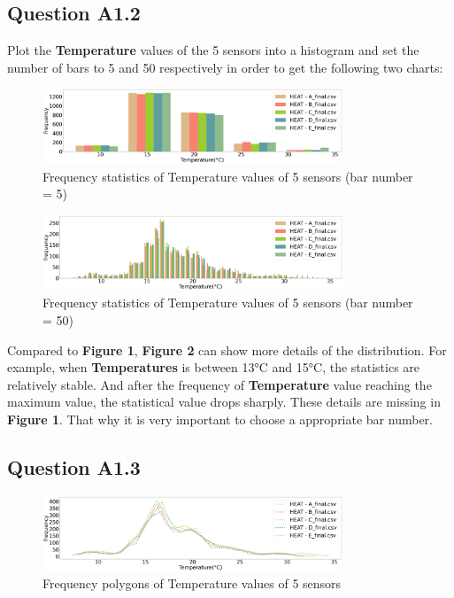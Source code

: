 \documentclass[a4paper]{article}
\begin{document}
\subsection{Question A1.2}

Plot the \textbf{Temperature} values of the 5 sensors into a histogram and set the number of bars to 5 and 50 respectively in order to get the following two charts:

\begin{figure}[htbp]
\centering
\includegraphics[width=0.8\textwidth]{images/multi_hist_bar_05.png} 
\caption{Frequency statistics of Temperature values of 5 sensors (bar number = 5)}
\end{figure}
\begin{figure}[htbp]
\centering
\includegraphics[width=0.8\textwidth]{images/multi_hist_bar_50.png} 
\caption{Frequency statistics of Temperature values of 5 sensors (bar number = 50)}
\label{Fig_mult_hist_temperature_50}
\end{figure}

\noindent Compared to \textbf{Figure 1}, \textbf{Figure 2} can show more details of the distribution. For example, when \textbf{Temperatures} is between 13°C and 15°C, the statistics are relatively stable. And after the frequency of \textbf{Temperature} value reaching the maximum value, the statistical value drops sharply. These details are missing in \textbf{Figure 1}. That why it is very important to choose a appropriate bar number.

\subsection{Question A1.3}
\begin{figure}[htbp]
\centering
\includegraphics[width=0.8\textwidth]{images/freq_polygen_temp.png} 
\caption{Frequency polygons of Temperature values of 5 sensors}
\label{Fig_mult_hist_temperature_05}
\end{figure}
\newpage
\end{document}
